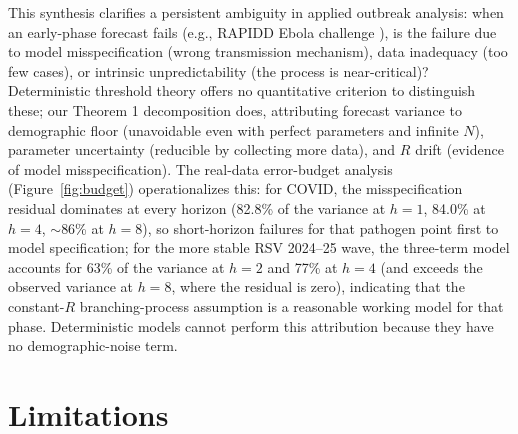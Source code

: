 \documentclass[review]{elsarticle}
\theoremstyle{plain}
\theoremstyle{definition}
\begin{document}
This synthesis clarifies a persistent ambiguity in applied outbreak analysis: when an early-phase forecast fails (e.g., RAPIDD Ebola challenge \citep{viboud2018rapidd}), is the failure due to model misspecification (wrong transmission mechanism), data inadequacy (too few cases), or intrinsic unpredictability (the process is near-critical)? Deterministic threshold theory offers no quantitative criterion to distinguish these; our Theorem 1 decomposition does, attributing forecast variance to demographic floor (unavoidable even with perfect parameters and infinite $N$), parameter uncertainty (reducible by collecting more data), and $R$ drift (evidence of model misspecification). The real-data error-budget analysis (Figure~\ref{fig:budget}) operationalizes this: for COVID, the misspecification residual dominates at every horizon (82.8\% of the variance at $h = 1$, 84.0\% at $h = 4$, $\sim$86\% at $h = 8$), so short-horizon failures for that pathogen point first to model specification; for the more stable RSV 2024--25 wave, the three-term model accounts for 63\% of the variance at $h = 2$ and 77\% at $h = 4$ (and exceeds the observed variance at $h = 8$, where the residual is zero), indicating that the constant-$R$ branching-process assumption is a reasonable working model for that phase. Deterministic models cannot perform this attribution because they have no demographic-noise term.


\section{Limitations}
\end{document}
